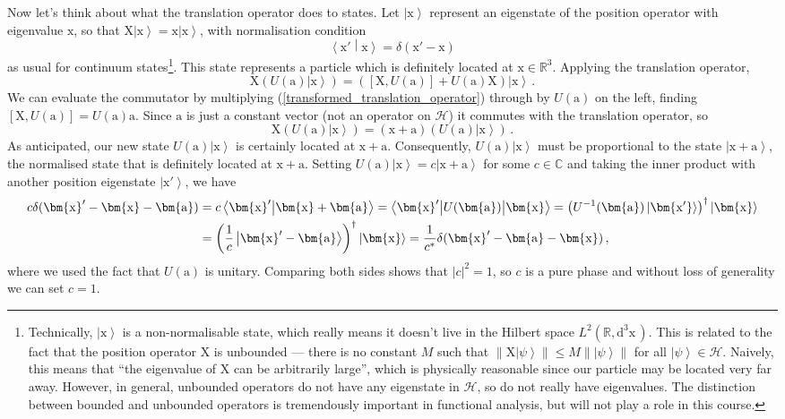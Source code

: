 \documentclass{article}
\theoremstyle{plain}\theoremheaderfont{\normalfont\itshape}\theorembodyfont{\rmfamily}\theoremseparator{.}\newtheorem*{rem}{Remark}\newtheorem*{ex}{Example}\newtheorem*{proof}{Proof}\newtheorem*{altp}{Alternative proof}
\theoremstyle{plain}\theoremheaderfont{\normalfont\bfseries}\theorembodyfont{\rmfamily}\theoremseparator{.}\newtheorem{thm}{Theorem}[section]\newtheorem{lem}[thm]{Lemma}\newtheorem{prop}[thm]{Proposition}\newtheorem*{cor}{Corollary}\newtheorem{defn}[thm]{Definition}\newtheorem{clm}[thm]{Claim}\newtheorem{clminproof}{Claim}
\theoremstyle{break}\theoremheaderfont{\normalfont\itshape}\theorembodyfont{\rmfamily}\theoremseparator{.\medskip}\newtheorem*{proofskip}{Proof}\newtheorem*{exs}{Examples}\newtheorem*{rems}{Remarks}
\theoremstyle{break}\theoremheaderfont{\normalfont\bfseries}\theorembodyfont{\rmfamily}\theoremseparator{.\medskip}\newtheorem{lemskip}[thm]{Lemma}\newtheorem{defnskip}[thm]{Definition}\newtheorem{propskip}[thm]{Proposition}\newtheorem{thmskip}[thm]{Theorem}
\numberwithin{equation}{section}
\newcommand{\dd}[2][]{\mathrm{d}^{#1} #2\,}
\newcommand{\ket}[1]{\left| #1 \right\rangle}
\newcommand{\braket}[2]{\left\langle #1 \middle| #2 \right\rangle}
\newcommand{\mel}[3]{\left\langle #1 \middle| #2 \middle| #3 \right\rangle}
\newcommand{\vb}[1]{\bm{\mathrm{#1}}}
\newcommand{\abs}[1]{\left| #1 \right|}
\newcommand{\norm}[1]{\left\| #1 \right\|}
\newcommand{\hb}{\mathcal{H}}
\newcommand{\RR}{\mathbb{R}}
\newcommand{\CC}{\mathbb{C}}
\begin{document}
    Now let's think about what the translation operator does to states. Let \(\ket{\vb{x}}\) represent an eigenstate of the position operator with eigenvalue \(\vb{x}\), so that \(\vb{X}\ket{\vb{x}}=\vb{x}\ket{\vb{x}}\), with normalisation condition
    \begin{equation}
        \braket{\vb{x}'}{\vb{x}}=\delta(\vb{x}'-\vb{x})
    \end{equation}
    as usual for continuum states\footnote{Technically, \(\ket{\vb{x}}\) is a non-normalisable state, which really means it doesn't live in the Hilbert space \(L^2(\RR,\dd[3]{\vb{x}})\). This is related to the fact that the position operator \(\vb{X}\) is unbounded --- there is no constant \(M\) such that \(\norm{\vb{X}\ket{\psi}}\le M\norm{\ket{\psi}}\) for all \(\ket{\psi}\in\hb\). Naively, this means that ``the eigenvalue of \(\vb{X}\) can be arbitrarily large'', which is physically reasonable since our particle may be located very far away. However, in general, unbounded operators do not have any eigenstate in \(\hb\), so do not really have eigenvalues. The distinction between bounded and unbounded operators is tremendously important in functional analysis, but will not play a role in this course.}. This state represents a particle which is definitely located at \(\vb{x}\in\RR^3\). Applying the translation operator,
    \begin{equation}
        \vb{X}(U(\vb{a})\ket{\vb{x}})=([\vb{X},U(\vb{a})]+U(\vb{a})\vb{X})\ket{\vb{x}}\,.
    \end{equation}
    We can evaluate the commutator by multiplying (\ref{transformed_translation_operator}) through by \(U(\vb{a})\) on the left, finding \([\vb{X},U(\vb{a})]=U(\vb{a})\vb{a}\). Since \(\vb{a}\) is just a constant vector (not an operator on \(\hb\)) it commutes with the translation operator, so
    \begin{equation}
        \vb{X}(U(\vb{a})\ket{\vb{x}})=(\vb{x}+\vb{a})(U(\vb{a})\ket{\vb{x}})\,.
    \end{equation}
    As anticipated, our new state \(U(\vb{a})\ket{\vb{x}}\) is certainly located at \(\vb{x}+\vb{a}\). Consequently, \(U(\vb{a})\ket{\vb{x}}\) must be proportional to the state \(\ket{\vb{x}+\vb{a}}\), the normalised state that is definitely located at \(\vb{x}+\vb{a}\). Setting \(U(\vb{a})\ket{\vb{x}}=c\ket{\vb{x}+\vb{a}}\) for some \(c\in\CC\) and taking the inner product with another position eigenstate \(\ket{\vb{x}'}\), we have
    \begin{align}
        c\delta(\vb{x}'-\vb{x}-\vb{a})&=c\braket{\vb{x}'}{\vb{x}+\vb{a}}=\mel{\vb{x}'}{U(\vb{a})}{\vb{x}}=\left(U^{-1}(\vb{a})\ket{\vb{x'}}\right)^\dagger\ket{\vb{x}}\notag\\
        &=\left(\frac{1}{c}\ket{\vb{x}'-\vb{a}}\right)^\dagger\ket{\vb{x}}=\frac{1}{c^*}\delta(\vb{x}'-\vb{a}-\vb{x})\,,
    \end{align}
    where we used the fact that \(U(\vb{a})\) is unitary. Comparing both sides shows that \(\abs{c}^2=1\), so \(c\) is a pure phase and without loss of generality we can set \(c=1\).
\end{document}
